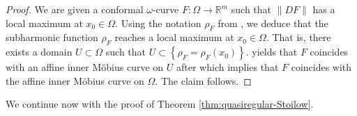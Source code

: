 \documentclass[a4paper,leqno,11pt]{amsart}
\numberwithin{equation}{section}
\theoremstyle{remark}
\theoremstyle{remark}
\newcommand{\R}{\mathbb{R}}
\begin{document}
\begin{proof}
We are given a conformal $\omega$-curve $F \colon \Omega \to \R^m$ such that $\|DF\|$ has a local maximum at $x_0 \in \Omega$. Using the notation $\rho_F$ from , we deduce that the subharmonic function $\rho_F$ reaches a local maximum at $x_0 \in \Omega$. That is, there exists a domain $U \subset \Omega$ such that $U \subset \left\{ \rho_F = \rho_F(x_0) \right\}$.  yields that $F$ coincides with an affine inner Möbius curve on $U$ after which  implies that $F$ coincides with the affine inner Möbius curve on $\Omega$. The claim follows.
\end{proof}


We continue now with the proof of Theorem \ref{thm:quasiregular-Stoilow}.

\qrStoilow*
\end{document}
